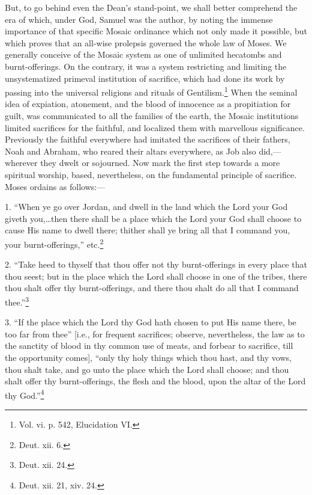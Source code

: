 But, to go behind even the Dean’s stand-point, we shall better comprehend the era of which, under God, Samuel was the author, by noting the immense importance of that specific Mosaic ordinance which not only made it possible, but which proves that an all-wise prolepsis governed the whole law of Moses. We generally conceive of the Mosaic system as one of unlimited hecatombs and burnt-offerings. On the contrary, it was a system restricting and limiting the unsystematized primeval institution of sacrifice, which had done its work by passing into the universal religions and rituals of Gentilism.\footnote{\par  Vol. vi. p. 542, Elucidation VI.} When the seminal idea of expiation, atonement, and the blood of innocence as a propitiation for guilt, was communicated to all the families of the earth, the Mosaic institutions limited sacrifices for the faithful, and localized them with marvellous significance. Previously the faithful everywhere had imitated the sacrifices of their fathers, Noah and Abraham, who reared their altars everywhere, as Job also did,—wherever they dwelt or sojourned. Now mark the first step towards a more spiritual worship, based, nevertheless, on the fundamental principle of sacrifice. Moses ordains as follows:—

1. “When ye go over Jordan, and dwell in the land which the Lord your God giveth you,…then there shall be a place which the Lord your God shall choose to cause His name to dwell there; thither shall ye bring all that I command you, your burnt-offerings,” etc.\footnote{\par  Deut. xii. 6.}

2. “Take heed to thyself that thou offer not thy burnt-offerings in every place that thou seest; but in the place which the Lord shall choose in one of the tribes, there thou shalt offer thy burnt-offerings, and there thou shalt do all that I command thee.”\footnote{\par  Deut. xii. 24.}

3. “If the place which the Lord thy God hath chosen to put His name there, be too far from thee” [i.e., for frequent sacrifices; observe, nevertheless, the law as to the sanctity of blood in thy common use of meats, and forbear to sacrifice, till the opportunity comes], “only thy holy things which thou hast, and thy vows, thou shalt take, and go unto the place which the Lord shall choose; and thou shalt offer thy burnt-offerings, the flesh and the blood, upon the altar of the Lord thy God.”\footnote{\par  Deut. xii. 21, xiv. 24.}

